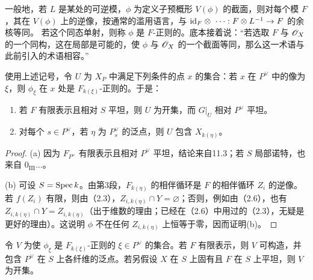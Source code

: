 一般地，若 $L$ 是某处的可逆模，$\phi$ 为定义子预概形 $V(\phi)$ 的截面，则对每个模 $F$，其在 $V(\phi)$ 上的逆像，按通常的滥用语言，与
$\mathrm{id}_F\otimes{}\,\cdots:F\otimes L^{-1}\to F$ 的余核等同。
若这个同态单射，则称 $\phi$ 是 $F$-正则的。底本接着说：“若选取 $F$ 与 $\mathscr O_X$ 的一个同构，这在局部是可能的，使 $\phi$ 与 $\mathscr O_X$ 的一个截面等同，那么这一术语与此前引入的术语相容。”

使用上述记号，令 $U$ 为 $X_P$ 中满足下列条件的点 $x$ 的集合：若 $x$ 在 $P^\vee$ 中的像为 $\xi$，则 $\phi_\xi$ 在 $x$ 处是 $F_{k(\xi)}$-正则的。于是：
\begin{enumerate}[label=(\alph*)]
\item 若 $F$ 有限表示且相对 $S$ 平坦，则 $U$ 为开集，而 $G|_U$ 相对 $P^\vee$ 平坦。
\item 对每个 $s\in P^\vee$，若 $\eta$ 为 $P^\vee_s$ 的泛点，则 $U$ 包含 $X_{k(\eta)}$。
\end{enumerate}
\begin{proof}
(a) 因为 $F_{P^\vee}$ 有限表示且相对 $P^\vee$ 平坦，结论来自11.3；若 $S$ 局部诺特，也来自 $0_{\mathrm{III}}\ldots$。

(b) 可设 $S=\operatorname{Spec} k$。由第3段，$F_{k(\eta)}$ 的相伴循环是 $F$ 的相伴循环 $Z_i$ 的逆像。
若 $f(Z_i)$ 有限，则由（2.3），$Z_{i,k(\eta)}\cap Y=\varnothing$；否则，例如由（2.6），也有
$Z_{i,k(\eta)}\cap Y=Z_{i,k(\eta)}$（出于维数的理由；已经在（2.6）中用过的（2.3），无疑是更好的理由）。这说明 $\phi$ 不在任何 $Z_{i,k(\eta)}$ 上恒等于零，因而证明(b)。
\end{proof}

令 $V$ 为使 $\phi_\xi$ 是 $F_{k(\xi)}$-正则的 $\xi\in P^\vee$ 的集合。若 $F$ 有限表示，则 $V$ 可构造，并包含 $P^\vee$ 在 $S$ 上各纤维的泛点。若另假设 $X$ 在 $S$ 上固有且 $F$ 在 $S$ 上平坦，则 $V$ 为开集。

